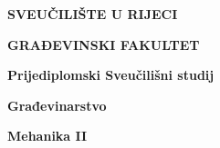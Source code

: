\thispagestyle{empty}

\vspace{\baselineskip}
\begin{Center}
{\fontsize{14pt}{16.8pt}\selectfont \textbf{SVEUČILIŠTE U RIJECI}\par}
\end{Center}\par

\begin{Center}
{\fontsize{14pt}{16.8pt}\selectfont \textbf{GRAĐEVINSKI FAKULTET}\par}
\end{Center}\par


\vspace{\baselineskip}
\begin{Center}
{\fontsize{14pt}{16.8pt}\selectfont \textbf{Prijediplomski Sveučilišni studij}\par}
\end{Center}\par

\begin{Center}
{\fontsize{14pt}{16.8pt}\selectfont \textbf{Građevinarstvo}\par}
\end{Center}\par

\begin{Center}
{\fontsize{14pt}{16.8pt}\selectfont \textbf{ {Mehanika II} }\par}
\end{Center}\par


%
%
%
%
%
%
%
%
%
%
%

\vskip 144pt

